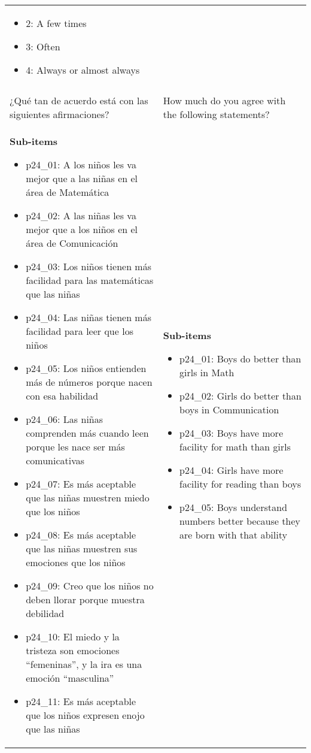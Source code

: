\documentclass[11pt]{article}
\begin{document}
\begin{longtable}{@{}LL@{}}
\begin{itemize}[leftmargin=*]
\item 2: A few times
\item 3: Often
\item 4: Always or almost always\end{itemize} \\
\addlinespace[4pt]
 \\ 
¿Qué tan de acuerdo está con las siguientes afirmaciones? & How much do you agree with the following statements? \\
\textbf{Sub-items}\par\begin{itemize}[leftmargin=*]\item p24\_01: A los niños les va mejor que a las niñas en el área de Matemática
\item p24\_02: A las niñas les va mejor que a los niños en el área de Comunicación
\item p24\_03: Los niños tienen más facilidad para las matemáticas que las niñas
\item p24\_04: Las niñas tienen más facilidad para leer que los niños
\item p24\_05: Los niños entienden más de números porque nacen con esa habilidad
\item p24\_06: Las niñas comprenden más cuando leen porque les nace ser más comunicativas
\item p24\_07: Es más aceptable que las niñas muestren miedo que los niños
\item p24\_08: Es más aceptable que las niñas muestren sus emociones que los niños
\item p24\_09: Creo que los niños no deben llorar porque muestra debilidad
\item p24\_10: El miedo y la tristeza son emociones “femeninas”, y la ira es una emoción “masculina”
\item p24\_11: Es más aceptable que los niños expresen enojo que las niñas\end{itemize} & \textbf{Sub-items}\par\begin{itemize}[leftmargin=*]\item p24\_01: Boys do better than girls in Math
\item p24\_02: Girls do better than boys in Communication
\item p24\_03: Boys have more facility for math than girls
\item p24\_04: Girls have more facility for reading than boys
\item p24\_05: Boys understand numbers better because they are born with that ability

\end{itemize}
\end{longtable}
\end{document}
